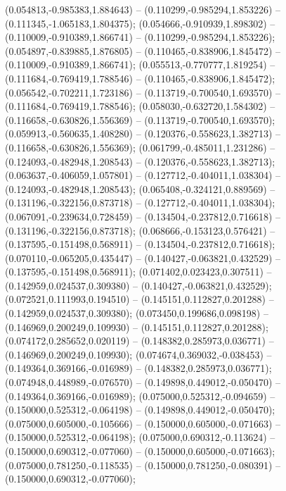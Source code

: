  (0.054813,-0.985383,1.884643) -- (0.110299,-0.985294,1.853226) -- (0.111345,-1.065183,1.804375);
 (0.054666,-0.910939,1.898302) -- (0.110009,-0.910389,1.866741) -- (0.110299,-0.985294,1.853226);
 (0.054897,-0.839885,1.876805) -- (0.110465,-0.838906,1.845472) -- (0.110009,-0.910389,1.866741);
 (0.055513,-0.770777,1.819254) -- (0.111684,-0.769419,1.788546) -- (0.110465,-0.838906,1.845472);
 (0.056542,-0.702211,1.723186) -- (0.113719,-0.700540,1.693570) -- (0.111684,-0.769419,1.788546);
 (0.058030,-0.632720,1.584302) -- (0.116658,-0.630826,1.556369) -- (0.113719,-0.700540,1.693570);
 (0.059913,-0.560635,1.408280) -- (0.120376,-0.558623,1.382713) -- (0.116658,-0.630826,1.556369);
 (0.061799,-0.485011,1.231286) -- (0.124093,-0.482948,1.208543) -- (0.120376,-0.558623,1.382713);
 (0.063637,-0.406059,1.057801) -- (0.127712,-0.404011,1.038304) -- (0.124093,-0.482948,1.208543);
 (0.065408,-0.324121,0.889569) -- (0.131196,-0.322156,0.873718) -- (0.127712,-0.404011,1.038304);
 (0.067091,-0.239634,0.728459) -- (0.134504,-0.237812,0.716618) -- (0.131196,-0.322156,0.873718);
 (0.068666,-0.153123,0.576421) -- (0.137595,-0.151498,0.568911) -- (0.134504,-0.237812,0.716618);
 (0.070110,-0.065205,0.435447) -- (0.140427,-0.063821,0.432529) -- (0.137595,-0.151498,0.568911);
 (0.071402,0.023423,0.307511) -- (0.142959,0.024537,0.309380) -- (0.140427,-0.063821,0.432529);
 (0.072521,0.111993,0.194510) -- (0.145151,0.112827,0.201288) -- (0.142959,0.024537,0.309380);
 (0.073450,0.199686,0.098198) -- (0.146969,0.200249,0.109930) -- (0.145151,0.112827,0.201288);
 (0.074172,0.285652,0.020119) -- (0.148382,0.285973,0.036771) -- (0.146969,0.200249,0.109930);
 (0.074674,0.369032,-0.038453) -- (0.149364,0.369166,-0.016989) -- (0.148382,0.285973,0.036771);
 (0.074948,0.448989,-0.076570) -- (0.149898,0.449012,-0.050470) -- (0.149364,0.369166,-0.016989);
 (0.075000,0.525312,-0.094659) -- (0.150000,0.525312,-0.064198) -- (0.149898,0.449012,-0.050470);
 (0.075000,0.605000,-0.105666) -- (0.150000,0.605000,-0.071663) -- (0.150000,0.525312,-0.064198);
 (0.075000,0.690312,-0.113624) -- (0.150000,0.690312,-0.077060) -- (0.150000,0.605000,-0.071663);
 (0.075000,0.781250,-0.118535) -- (0.150000,0.781250,-0.080391) -- (0.150000,0.690312,-0.077060);
